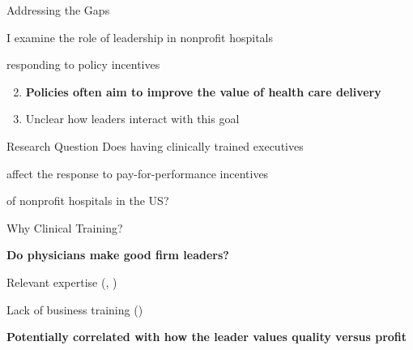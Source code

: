 \documentclass[notes,11pt, aspectratio=169]{beamer}
\newenvironment{wideitemize}{\itemize\addtolength{\itemsep}{10pt}}{\enditemize}
\begin{document}
\begin{frame}{Addressing the Gaps}

    \Large
    \begin{block}{}
    \begin{center}
    I examine the role of leadership in nonprofit hospitals
    
    responding to policy incentives
    \end{center}
    \end{block}


\vspace{18mm} \large

\begin{enumerate}
    \setcounter{enumi}{1}
    \item  \large \textbf{Policies often aim to improve the value of health care delivery}

\vspace{2mm}

    \begin{wideitemize}
        \item \normalsize Unclear how leaders interact with this goal
    \end{wideitemize}

    \end{enumerate}
\end{frame}

\begin{frame}{Research Question}
    \centering
    \Large
    Does having clinically trained executives

    \vspace{1mm}
    
    affect the response to pay-for-performance incentives 

    \vspace{1mm}
    
    of nonprofit hospitals in the US?
\end{frame}

\begin{frame}{Why Clinical Training?}

\large

\textbf{Do physicians make good firm leaders?}

\vspace{2mm}

\begin{wideitemize}
    \item Relevant expertise \scriptsize (\cite{Stajduhar_2023}, \cite{Ahmed_2022}) \large

    
    \item Lack of business training \scriptsize (\cite{HarvardBusinessReview2018})
\end{wideitemize}

\vspace{12mm}

\textbf{Potentially correlated with how the leader values quality versus profit}
\end{frame}
\end{document}

